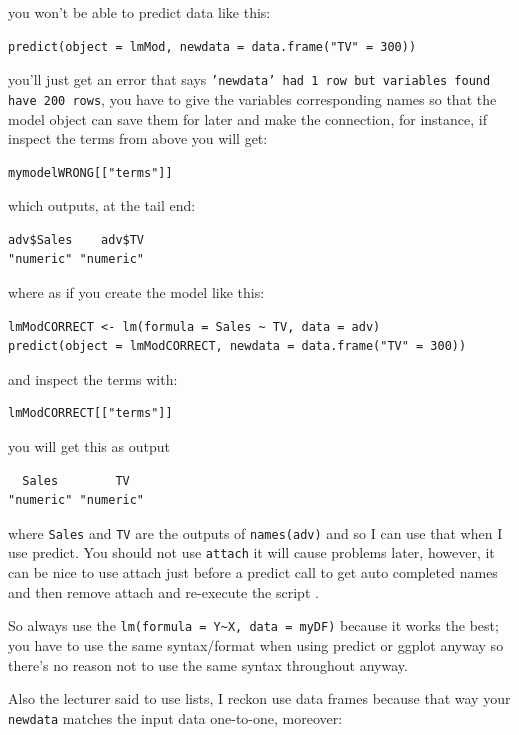 \documentclass[11pt]{article}
\begin{document}
\begin{enumerate}
you won't be able to predict data like this:

\begin{verbatim}
predict(object = lmMod, newdata = data.frame("TV" = 300))
\end{verbatim}

you'll just get an error that says
\texttt{'newdata' had 1 row but variables found have 200 rows}, you have to
give the variables corresponding names so that the model object can save
them for later and make the connection, for instance, if inspect the
terms from above you will get:

\begin{verbatim}
mymodelWRONG[["terms"]]
\end{verbatim}

which outputs, at the tail end:

\begin{verbatim}
adv$Sales    adv$TV
"numeric" "numeric"
\end{verbatim}

where as if you create the model like this:

\begin{verbatim}
lmModCORRECT <- lm(formula = Sales ~ TV, data = adv)
predict(object = lmModCORRECT, newdata = data.frame("TV" = 300))
\end{verbatim}

and inspect the terms with:

\begin{verbatim}
lmModCORRECT[["terms"]]
\end{verbatim}

you will get this as output

\begin{verbatim}
  Sales        TV
"numeric" "numeric"
\end{verbatim}

where \texttt{Sales} and \texttt{TV} are the outputs of \texttt{names(adv)} and so I can use
that when I use predict. You should not use \texttt{attach} it will cause
problems later, however, it can be nice to use attach just before a
predict call to get auto completed names and then remove attach and
re-execute the script .

So always use the \texttt{lm(formula = Y\textasciitilde{}X, data = myDF)} because it works the
best; you have to use the same syntax/format when using predict or
ggplot anyway so there's no reason not to use the same syntax throughout
anyway.

Also the lecturer said to use lists, I reckon use data frames because
that way your \texttt{newdata} matches the input data one-to-one, moreover:


\end{enumerate}
\end{document}
